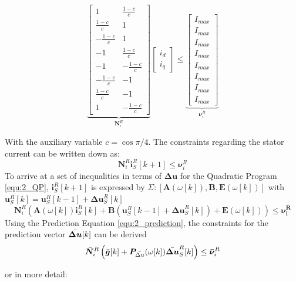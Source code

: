 \[
\scriptstyle
\underbrace{
	\begin{bmatrix}
		1 & \frac{1-c}{c} \\
		\frac{1-c}{c} & 1 \\
		-\frac{1-c}{c} & 1 \\
		-1 & \frac{1-c}{c} \\
		-1 & -\frac{1-c}{c} \\
		-\frac{1-c}{c} & -1 \\
		\frac{1-c}{c} & -1 \\
		1 & -\frac{1-c}{c}
	\end{bmatrix}
}_{\bm{N}_i^R}
\begin{bmatrix}
	i_{d} \\
	i_{q}
\end{bmatrix}
\le
\underbrace{
	\begin{bmatrix}
		I_{max} \\
		I_{max} \\
		I_{max} \\
		I_{max} \\
		I_{max} \\
		I_{max} \\
		I_{max} \\
		I_{max}
	\end{bmatrix}
}_{\bm{\nu}_i^R}
\]

With the auxiliary variable $c = \cos{\pi/4}$. The constraints regarding the stator current can be written down as:
\[
\bm{N}_i^R{\bm{i}^R_S[k+1]} \le \bm{\nu}^R_i
\]
To arrive at a set of inequalities in terms of $\bm{\Delta u}$ for the Quadratic Program \eqref{equ:2_QP}, $\bm{i}^R_S[k+1]$ is expressed by  $\Sigma: \left[\bm{A}(\omega[k]),\bm{B},\bm{E}(\omega[k])\right]$ with $\bm{u}^R_S[k] = \bm{u}^R_S[k-1] + \bm{\Delta u}^R_S[k]$
\[
\bm{N}_i^R \left(\bm{A}(\omega[k])\bm{i}^R_S[k]+\bm{B}\left( \bm{u}^R_S[k-1] + \bm{\Delta u}^R_S[k] \right)+\bm{E}(\omega[k])\right)\le \bm{\nu^R_i}
\]
Using the Prediction Equation \eqref{equ:2_prediction}, the constraints for the prediction vector $\Bar{\bm{\Delta u}}[k]$ can be derived
\[
\Bar{\bm{N}}_i^R \left(\Bar{\bm{g}}[k]+ \bm{P}_{\Bar{\Delta u}}(\omega[k]) \Bar{\bm{\Delta u}}^R_S[k] \right)\le \bm{\Bar{\nu}}^R_i
\]

or in more detail:


